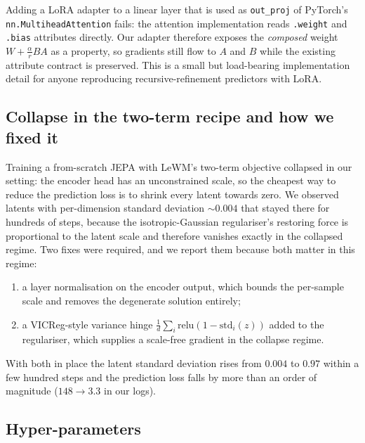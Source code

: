 Adding a LoRA adapter to a linear layer that is used as \texttt{out\_proj} of PyTorch's
\texttt{nn.MultiheadAttention} fails: the attention implementation reads \texttt{.weight} and
\texttt{.bias} attributes directly. Our adapter therefore exposes the \emph{composed} weight
$W+\frac{\alpha}{r}BA$ as a property, so gradients still flow to $A$ and $B$ while the
existing attribute contract is preserved. This is a small but load-bearing implementation
detail for anyone reproducing recursive-refinement predictors with LoRA.

\subsection{Collapse in the two-term recipe and how we fixed it}\label{sec:collapse}

Training a from-scratch JEPA with LeWM's two-term objective collapsed in our setting: the
encoder head has an unconstrained scale, so the cheapest way to reduce the prediction loss is
to shrink every latent towards zero. We observed latents with per-dimension standard deviation
$\sim0.004$ that stayed there for hundreds of steps, because the isotropic-Gaussian
regulariser's restoring force is proportional to the latent scale and therefore vanishes
exactly in the collapsed regime. Two fixes were required, and we report them because both
matter in this regime:

\begin{enumerate}[leftmargin=1.2em,itemsep=2pt]
\item a layer normalisation on the encoder output, which bounds the per-sample scale and
removes the degenerate solution entirely;
\item a VICReg-style variance hinge $\frac1d\sum_i \mathrm{relu}(1-\mathrm{std}_i(z))$ added to
the regulariser, which supplies a scale-free gradient in the collapse regime.
\end{enumerate}
With both in place the latent standard deviation rises from $0.004$ to $0.97$ within a few
hundred steps and the prediction loss falls by more than an order of magnitude
($148\to3.3$ in our logs).

\subsection{Hyper-parameters}

